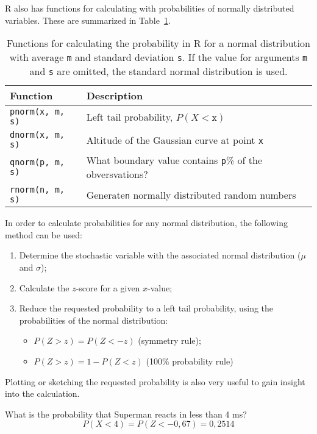 R also has functions for calculating with probabilities of normally distributed variables. These are summarized in Table~\ref{rab:norm-prob-r}.

\begin{table}
  \centering
  \begin{tabular}{ll}
  	\textbf{Function}     & \textbf{Description}                                           \\ \hline
  	\verb|pnorm(x, m, s)| & Left tail probability, $P(X<\mathtt{x})$                       \\
  	\verb|dnorm(x, m, s)| & Altitude of the Gaussian curve at point \texttt{x}             \\
  	\verb|qnorm(p, m, s)| & What boundary value contains \texttt{p}\% of the obversvations?\\
  	\verb|rnorm(n, m, s)| & Generate\texttt{n} normally distributed random numbers
  \end{tabular}

  \caption{Functions for calculating the probability in R for a normal distribution with average \texttt{m} and standard deviation \texttt{s}. If the value for arguments \texttt{m} and \texttt{s} are omitted, the standard normal distribution is used.}
  \label{rab:norm-prob-r}
\end{table}

In order to calculate probabilities for any normal distribution, the following method can be used:

\begin{enumerate}
  \item Determine the stochastic variable with the associated normal distribution ($\mu$ and $\sigma$);
  \item Calculate the $z$-score for a given $x$-value;
  \item Reduce the requested probability to a left tail probability, using the probabilities of the normal distribution:
  \begin{itemize}
    \item $P(Z > z) = P(Z < -z)$ (symmetry rule);
    \item $P(Z > z) = 1 - P(Z < z)$ (100\% probability rule)
  \end{itemize}
\end{enumerate}

Plotting or sketching the requested probability is also very useful to gain insight into the calculation.

\begin{example}
What is the probability that Superman reacts in less than 4 ms?
\[ P(X < 4) = P(Z < -0,67) = 0,2514 \]
\end{example}

